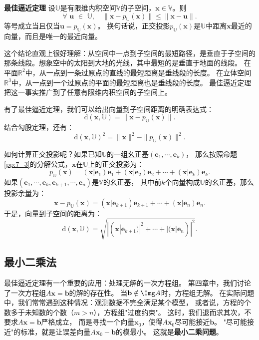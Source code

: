 \documentclass[12pt,UTF8,fontset=none]{ctexbook}
\begin{document}
\begin{pp}\textbf{最佳逼近定理}\label{pp:7_9}
设$\mathbb{U}$是有限维内积空间$\mathbb{V}$的子空间，$\mathbf{x} \in \mathbb{V}$。则
$$ \forall \,\, \mathbf{u} \,\, \in \,\, \mathbb{U}, \quad \|\mathbf{x} - p_\mathbb{U}(\mathbf{x})\| \leqslant \|\mathbf{x} - \mathbf{u}\|. $$
等号成立当且仅当$\mathbf{u} = p_\mathbb{U}(\mathbf{x})$。
换句话说，正交投影$p_\mathbb{U}(\mathbf{x})$是$\mathbb{U}$中距离$\mathbf{x}$最近的向量，而且是唯一的最近向量。
\end{pp}

这个结论直观上很好理解：从空间中一点到子空间的最短路径，是垂直于子空间的那条线段。想象空中的太阳到大地的光线，其中最短的是垂直于地面的线段。
在平面$\mathbb{R}^2$中，从一点到一条过原点的直线的最短距离是垂线段的长度。
在立体空间$\mathbb{R}^3$中，从一点到一个过原点的平面的最短距离也是垂线段的长度。
最佳逼近定理把这一事实推广到了任意有限维内积空间的子空间上。

有了最佳逼近定理，我们可以给出向量到子空间距离的明确表达式：
$$ \mathrm{d}(\mathbf{x}, \mathbb{U}) = \|\mathbf{x} - p_\mathbb{U}(\mathbf{x})\|. $$
结合勾股定理，还有：
$$ \mathrm{d}(\mathbf{x}, \mathbb{U})^2 = \|\mathbf{x}\|^2 - \|p_\mathbb{U}(\mathbf{x})\|^2. $$

如何计算正交投影呢？如果已知$\mathbb{U}$的一组幺正基$(\mathbf{e}_1, \cdots, \mathbf{e}_k)$，
那么按照命题\ref{pp:7_3}的分解公式，$\mathbf{x}$在$\mathbb{U}$上的正交投影为：
$$ p_\mathbb{U}(\mathbf{x}) = (\mathbf{x}|\mathbf{e}_1)\mathbf{e}_1 + (\mathbf{x}|\mathbf{e}_2)\mathbf{e}_2 + \cdots + (\mathbf{x}|\mathbf{e}_k)\mathbf{e}_k. $$
如果$(\mathbf{e}_1, \cdots, \mathbf{e}_k, \mathbf{e}_{k+1}, \cdots, \mathbf{e}_n)$是$\mathbb{V}$的幺正基，
其中前$k$个向量构成$\mathbb{U}$的幺正基，那么投影余量为：
$$ \mathbf{x} - p_\mathbb{U}(\mathbf{x}) = (\mathbf{x}|\mathbf{e}_{k+1})\mathbf{e}_{k+1} + \cdots + (\mathbf{x}|\mathbf{e}_n)\mathbf{e}_n. $$
于是，向量到子空间的距离为：
$$ \mathrm{d}(\mathbf{x}, \mathbb{U}) = \sqrt{|(\mathbf{x}|\mathbf{e}_{k+1})|^2 + \cdots + |(\mathbf{x}|\mathbf{e}_n)|^2}. $$

\subsection{最小二乘法}

最佳逼近定理有一个重要的应用：处理无解的一次方程组。
第四章中，我们讨论了一次方程组$A\mathbf{x} = \mathbf{b}$的解的存在性。
当$\mathbf{b} \notin \Img A$时，方程组无解。
在实际问题中，我们常常遇到这种情况：观测数据不完全满足某个模型，
或者说，方程的个数多于未知数的个数（$m > n$），方程组"过度约束"。
这时，我们退而求其次，不要求$A\mathbf{x} = \mathbf{b}$严格成立，
而是寻找一个向量$\mathbf{x}_0$，使得$A\mathbf{x}_0$尽可能接近$\mathbf{b}$。
"尽可能接近"的标准，就是让误差向量$A\mathbf{x}_0 - \mathbf{b}$的模最小。
这就是\textbf{最小二乘问题}。
\end{document}
